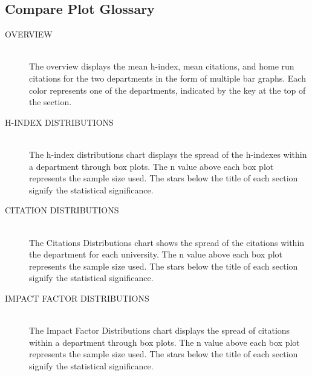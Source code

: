 \subsection{Compare Plot Glossary}




\begin{description}
  \item[OVERVIEW] \hfill \\
  The overview displays the mean h-index, mean citations, and home run citations for the two departments in the form of multiple bar graphs. Each color represents one of the departments, indicated by the key at the top of the section.
  \item[H-INDEX DISTRIBUTIONS] \hfill \\
  The h-index distributions chart displays the spread of the h-indexes within a department through box plots. The n value above each box plot represents the sample size used. The stars below the title of each section signify the statistical significance.
  \item[CITATION DISTRIBUTIONS] \hfill \\
  The Citations Distributions chart shows the spread of the citations within the department for each university. The n value above each box plot represents the sample size used. The stars below the title of each section signify the statistical significance.
  \item[IMPACT FACTOR DISTRIBUTIONS] \hfill \\
  The Impact Factor Distributions chart displays the spread of citations within a department through box plots. The n value above each box plot represents the sample size used. The stars below the title of each section signify the statistical significance.
\end{description}












